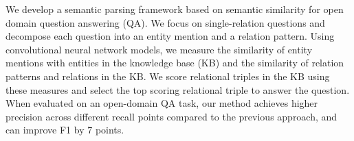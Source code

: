 We develop a semantic parsing framework based on semantic similarity for open domain question answering (QA). We focus on single-relation questions and decompose each question into an entity mention and a relation pattern. Using convolutional neural network models, we measure the similarity of entity mentions with entities in the knowledge base (KB) and the similarity of relation patterns and relations in the KB. We score relational triples in the KB using these measures and select the top scoring relational triple to answer the question. When evaluated on an open-domain QA task, our method achieves higher precision across different recall points compared to the previous approach, and can improve F1 by 7 points.
